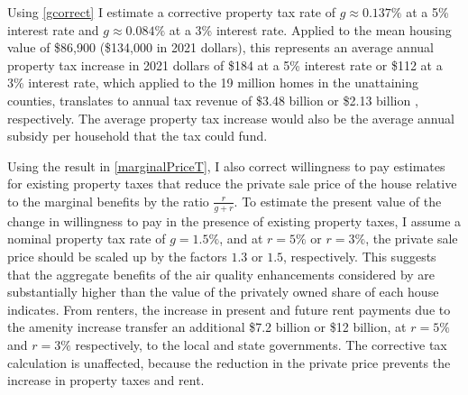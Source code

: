 \documentclass[ecta,nameyear,draft]{econsocart}
\theoremstyle{plain}
\theoremstyle{remark}
\begin{document}
Using \ref{gcorrect} I estimate a corrective property tax rate of $g\approx 0.137\%$ at a 5\% interest rate and $g\approx 0.084\%$ at a 3\% interest rate. Applied to the mean housing value of \$86,900 (\$134,000 in 2021 dollars), this represents an average annual property tax increase in 2021 dollars of \$184 at a 5\% interest rate or \$112 at a 3\% interest rate, which applied to the 19 million homes in the unattaining counties, translates to annual tax revenue of \$3.48 billion %
or \$2.13 billion%
, respectively. The average property tax increase would also be the average annual subsidy per household that the tax could fund. 

Using the result in \ref{marginalPriceT}, I also correct willingness to pay estimates for existing property taxes that reduce the private sale price of the house relative to the marginal benefits by the ratio $\frac{r}{g+r}$. To estimate the present value of the change in willingness to pay in the presence of existing property taxes, I assume a nominal property tax rate of $g=1.5\%$, and at $r=5\%$ or $r=3\%$, the private sale price should be scaled up by the factors $1.3$ or $1.5$, respectively. This suggests that the aggregate benefits of the air quality enhancements considered by \cite{chaygreenstone05} are substantially higher than the value of the privately owned share of each house indicates. From renters, the increase in present and future rent payments due to the amenity increase transfer an additional \$7.2 billion or \$12 billion, at $r=5\%$ and $r=3\%$ respectively, to the local and state governments. The corrective tax calculation is unaffected, because the reduction in the private price prevents the increase in property taxes and rent.

\end{document}
